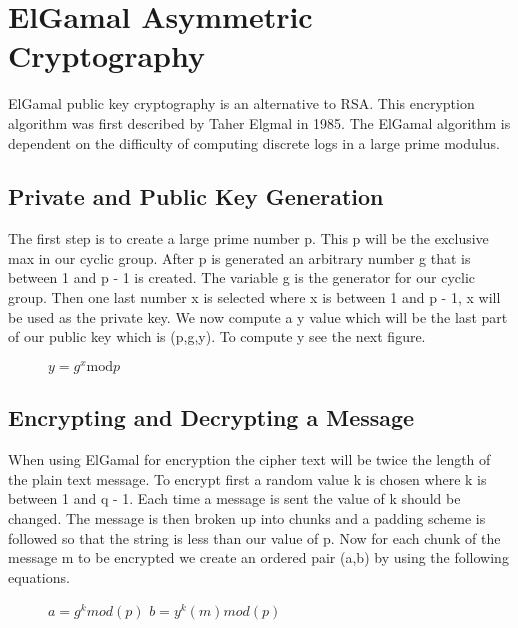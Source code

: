 \documentclass[conference]{IEEEtran}
\begin{document}
\section{ElGamal Asymmetric Cryptography}
ElGamal public key cryptography is an alternative to RSA. This encryption algorithm was first described by Taher Elgmal in 1985. The ElGamal algorithm is dependent on the difficulty of computing discrete logs in a large prime modulus.

\subsection{Private and Public Key Generation}
The first step is to create a large prime number p. This p will be the exclusive max in our cyclic group. After p is generated an arbitrary number g that is between 1 and p - 1 is created. The variable g is the generator for our cyclic group. Then one last number x is selected where x is between 1 and p - 1, x will be used as the private key. We now compute a y value which will be the last part of our public key which is (p,g,y). To compute y see the next figure.

\begin{figure}[h]
	\begin{center}
		$y={g}^{x}\mathrm{mod}p$
	\end{center}
\end{figure}


\subsection{Encrypting and Decrypting a Message}

When using ElGamal for encryption the cipher text will be twice the length of the plain text message.
To encrypt first a random value k is chosen where k is between 1 and q - 1. Each time a message is sent the value of k should be changed. The message is then broken up into chunks and a padding scheme is followed so that the string is less than our value of p. Now for each chunk of the message m to be encrypted we create an ordered pair (a,b) by using the following equations.

\begin{figure}[h]
	\begin{center}
		$a={g}^{k}mod\left(p\right)$ \newline
		$b={y}^{k}\left(m\right)mod\left(p\right)$ \newline
	\end{center}
\end{figure}
\end{document}
